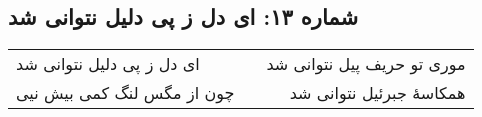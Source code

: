 \begin{center}
\section*{شماره ۱۳: ای دل ز پی دلیل نتوانی شد}
\label{sec:013}
\begin{longtable}{l p{0.5cm} r}
ای دل ز پی دلیل نتوانی شد
&&
موری تو حریف پیل نتوانی شد
\\
چون از مگس لنگ کمی بیش نیی
&&
همکاسهٔ جبرئیل نتوانی شد
\\
\end{longtable}
\end{center}
